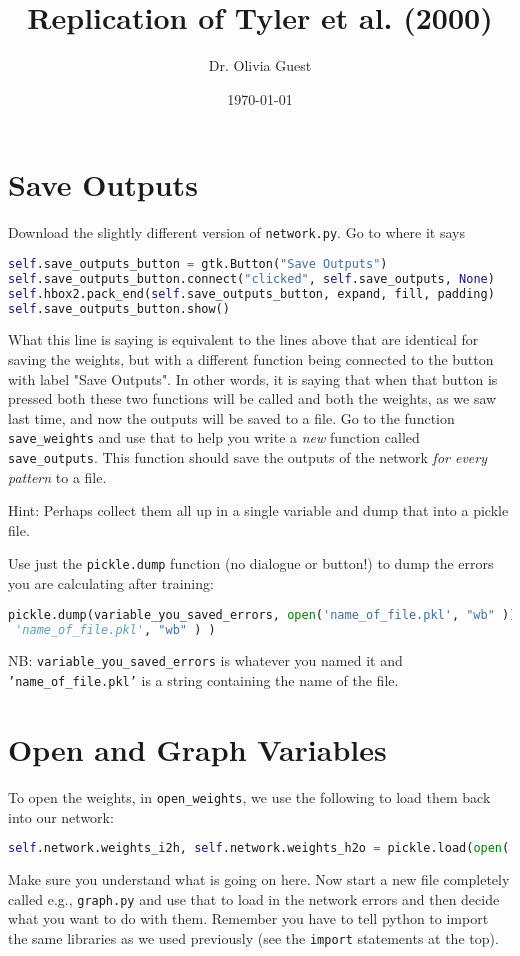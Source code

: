 \documentclass[a4paper,10pt]{article}
\title{Replication of Tyler et al. (2000)}
\author{Dr. Olivia Guest}
\date{\today}
\begin{document}
\maketitle

\section{Save Outputs}
Download the slightly different version of \texttt{network.py}. Go to where it says
\begin{lstlisting}[language=Python]
self.save_outputs_button = gtk.Button("Save Outputs")
self.save_outputs_button.connect("clicked", self.save_outputs, None)
self.hbox2.pack_end(self.save_outputs_button, expand, fill, padding)
self.save_outputs_button.show()
\end{lstlisting}

What this line is saying is equivalent to the lines above that are identical for saving the weights, but with a different function being connected to the button with label "Save Outputs". In other words, it is saying that when that button is pressed both these two functions will be called and both the weights, as we saw last time, and now the outputs will be saved to a file. Go to the function \texttt{save\_weights} and use that to help you write a \emph{new} function called \texttt{save\_outputs}. This function should save the outputs of the network \emph{for every pattern} to a file.

Hint: Perhaps collect them all up in a single variable and dump that into a pickle file.

Use just the \texttt{pickle.dump} function (no dialogue or button!) to dump the errors you are calculating after training:
\begin{lstlisting}[language=Python]
pickle.dump(variable_you_saved_errors, open('name_of_file.pkl', "wb" ))
 'name_of_file.pkl', "wb" ) )
\end{lstlisting}
NB: \texttt{variable\_you\_saved\_errors} is whatever you named it and \texttt{'name\_of\_file.pkl'} is a string containing the name of the file.

\section{Open and Graph Variables}
To open the weights, in \texttt{open\_weights}, we use the following to load them back into our network:
\begin{lstlisting}[language=Python]
self.network.weights_i2h, self.network.weights_h2o = pickle.load(open( dialog.get_filename(), "rb" ) )
\end{lstlisting}
Make sure you understand what is going on here. Now start a new file completely called e.g., \texttt{graph.py} and use that to load in the network errors and then decide what you want to do with them. Remember you have to tell python to import the same libraries as we used previously (see the \texttt{import} statements at the top). 
\end{document}
